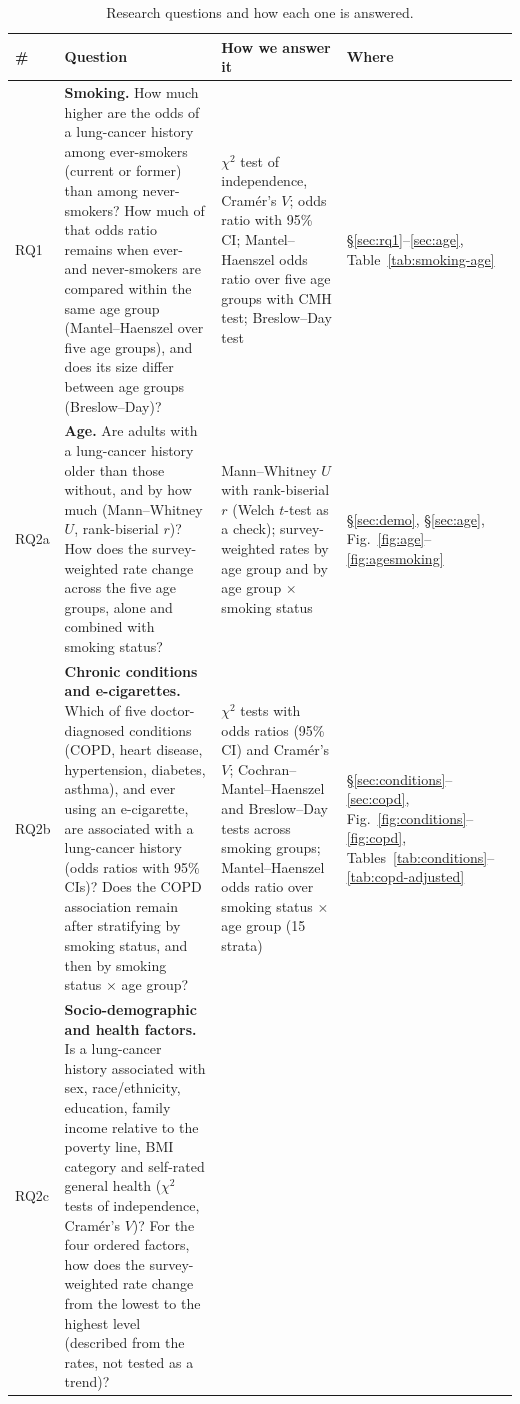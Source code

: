 \begin{table}[htbp]
\centering\small
\caption{Research questions and how each one is answered.}\label{tab:rq}
\begin{tabularx}{\textwidth}{@{}l >{\raggedright\arraybackslash}X >{\raggedright\arraybackslash}p{4.1cm} >{\raggedright\arraybackslash}p{2.2cm}@{}}
\toprule
\# & Question & How we answer it & Where \\
\midrule
RQ1 & \textbf{Smoking.} How much higher are the odds of a lung-cancer history among ever-smokers (current or former) than among never-smokers? How much of that odds ratio remains when ever- and never-smokers are compared within the same age group (Mantel--Haenszel over five age groups), and does its size differ between age groups (Breslow--Day)?
 & $\chi^2$ test of independence, Cram\'er's $V$; odds ratio with 95\% CI; Mantel--Haenszel odds ratio over five age groups with CMH test; Breslow--Day test
 & \S\ref{sec:rq1}--\ref{sec:age}, Table~\ref{tab:smoking-age} \\
\addlinespace
RQ2a & \textbf{Age.} Are adults with a lung-cancer history older than those without, and by how much (Mann--Whitney $U$, rank-biserial $r$)? How does the survey-weighted rate change across the five age groups, alone and combined with smoking status?
 & Mann--Whitney $U$ with rank-biserial $r$ (Welch $t$-test as a check); survey-weighted rates by age group and by age group $\times$ smoking status
 & \S\ref{sec:demo}, \S\ref{sec:age}, Fig.~\ref{fig:age}--\ref{fig:agesmoking} \\
\addlinespace
RQ2b & \textbf{Chronic conditions and e-cigarettes.} Which of five doctor-diagnosed conditions (COPD, heart disease, hypertension, diabetes, asthma), and ever using an e-cigarette, are associated with a lung-cancer history (odds ratios with 95\% CIs)? Does the COPD association remain after stratifying by smoking status, and then by smoking status $\times$ age group?
 & $\chi^2$ tests with odds ratios (95\% CI) and Cram\'er's $V$; Cochran--Mantel--Haenszel and Breslow--Day tests across smoking groups; Mantel--Haenszel odds ratio over smoking status $\times$ age group (15 strata)
 & \S\ref{sec:conditions}--\ref{sec:copd}, Fig.~\ref{fig:conditions}--\ref{fig:copd}, Tables~\ref{tab:conditions}--\ref{tab:copd-adjusted} \\
\addlinespace
RQ2c & \textbf{Socio-demographic and health factors.} Is a lung-cancer history associated with sex, race/ethnicity, education, family income relative to the poverty line, BMI category and self-rated general health ($\chi^2$ tests of independence, Cram\'er's $V$)? For the four ordered factors, how does the survey-weighted rate change from the lowest to the highest level (described from the rates, not tested as a trend)?

\end{tabularx}
\end{table}
